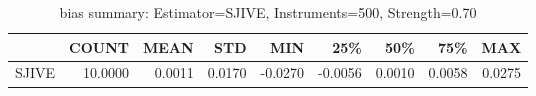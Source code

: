 \begin{table}[ht]
\centering
\caption{bias summary: Estimator=SJIVE, Instruments=500, Strength=0.70}
\begin{tabular}{lrrrrrrrr}
\toprule
 & COUNT & MEAN & STD & MIN & 25\% & 50\% & 75\% & MAX \\
\midrule
SJIVE & 10.0000 & 0.0011 & 0.0170 & -0.0270 & -0.0056 & 0.0010 & 0.0058 & 0.0275 \\
\bottomrule
\end{tabular}
\end{table}

